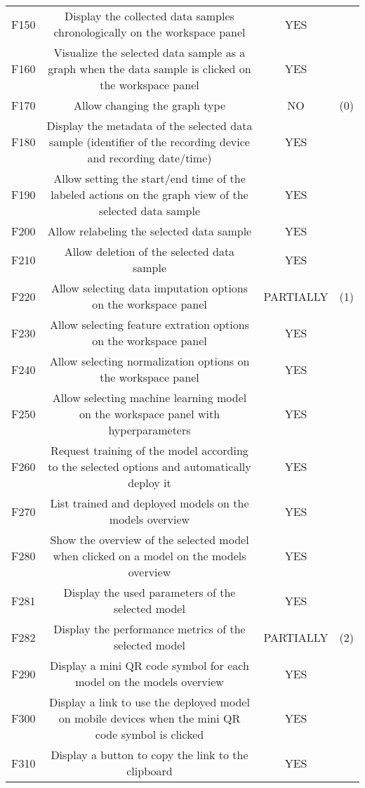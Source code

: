 \begin{center}
{\begin{tabular}{c||c|c|c}
        F150 & Display the collected data samples chronologically on the workspace panel & YES &  \\
        F160 & Visualize the selected data sample as a graph when the data sample is clicked on the workspace panel & YES &  \\
        F170 & Allow changing the graph type & NO & (0) \\
        F180 & Display the metadata of the selected data sample (identifier of the recording device and recording date/time) & YES &  \\
        F190 & Allow setting the start/end time of the labeled actions on the graph view of the selected data sample & YES &  \\
        F200 & Allow relabeling the selected data sample & YES &  \\
        F210 & Allow deletion of the selected data sample & YES &  \\
        F220 & Allow selecting data imputation options on the workspace panel & PARTIALLY & (1) \\
        F230 & Allow selecting feature extration options on the workspace panel & YES &  \\
        F240 & Allow selecting normalization options on the workspace panel& YES &  \\
        F250 & Allow selecting machine learning model on the workspace panel with hyperparameters & YES &  \\
        F260 & Request training of the model according to the selected options and automatically deploy it & YES &  \\
        F270 & List trained and deployed models on the models overview & YES &  \\
        F280 & Show the overview of the selected model when clicked on a model on the models overview & YES &  \\
        F281 & Display the used parameters of the selected model & YES &  \\
        F282 & Display the performance metrics of the selected model & PARTIALLY & (2) \\
        F290 & Display a mini QR code symbol for each model on the models overview & YES &  \\
        F300 & Display a link to use the deployed model on mobile devices when the mini QR code symbol is clicked & YES &  \\
        F310 & Display a button to copy the link to the clipboard & YES &  \\

\end{tabular}}
\end{center}
